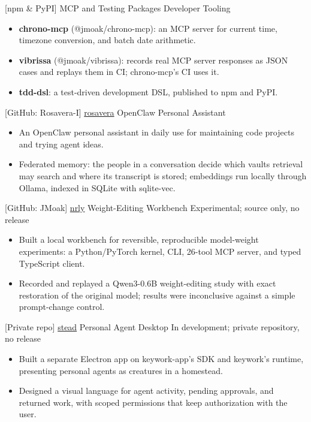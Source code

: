 \documentclass[]{moak-resume}
\begin{document}
\begin{entrylist}
  \entry
    {[npm \& PyPI]}
    {MCP and Testing Packages}
    {Developer Tooling}
    {}
\end{entrylist}
\begin{itemize}
  \item \textbf{chrono-mcp} (@jmoak/chrono-mcp): an MCP server for current time, timezone conversion, and batch date arithmetic.
  \item \textbf{vibrissa} (@jmoak/vibrissa): records real MCP server responses as JSON cases and replays them in CI; chrono-mcp's CI uses it.
  \item \textbf{tdd-dsl}: a test-driven development DSL, published to npm and PyPI.
\end{itemize}

\begin{entrylist}
  \entry
    {[GitHub: Rosavera-I]}
    {\href{https://github.com/Rosavera-I}{rosavera}}
    {OpenClaw Personal Assistant}
    {}
\end{entrylist}
\begin{itemize}
  \item An OpenClaw personal assistant in daily use for maintaining code projects and trying agent ideas.
  \item Federated memory: the people in a conversation decide which vaults retrieval may search and where its transcript is stored; embeddings run locally through Ollama, indexed in SQLite with sqlite-vec.
\end{itemize}

\begin{entrylist}
  \entry
    {[GitHub: JMoak]}
    {\href{https://github.com/JMoak/nrly}{nrly}}
    {Weight-Editing Workbench}
    {Experimental; source only, no release}
\end{entrylist}
\begin{itemize}
  \item Built a local workbench for reversible, reproducible model-weight experiments: a Python/PyTorch kernel, CLI, 26-tool MCP server, and typed TypeScript client.
  \item Recorded and replayed a Qwen3-0.6B weight-editing study with exact restoration of the original model; results were inconclusive against a simple prompt-change control.
\end{itemize}

\begin{entrylist}
  \entry
    {[Private repo]}
    {\href{https://moak.dev/stead}{stead}}
    {Personal Agent Desktop}
    {In development; private repository, no release}
\end{entrylist}
\begin{itemize}
  \item Built a separate Electron app on keywork-app's SDK and keywork's runtime, presenting personal agents as creatures in a homestead.
  \item Designed a visual language for agent activity, pending approvals, and returned work, with scoped permissions that keep authorization with the user.
\end{itemize}
\end{document}
